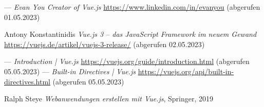 \begin{thebibliography}{99}
	---
	\emph{Evan You Creator of Vue.js}
	\url{https://www.linkedin.com/in/evanyou}
	(abgerufen 01.05.2023)

	Antony Konstantinidis
	\emph{Vue.js 3 – das JavaScript Framework im neuem Gewand}
	\url{https://vuejs.de/artikel/vuejs-3-release/}
	(abgerufen 02.05.2023)

	---
	\emph{Introduction | Vue.js}
	\url{https://vuejs.org/guide/introduction.html}
	(abgerufen 05.05.2023)
	---
	\emph{Built-in Directives | Vue.js}
	\url{https://vuejs.org/api/built-in-directives.html}
	(abgerufen 05.05.2023)

	Ralph Steye
	\emph{Webanwendungen erstellen mit Vue.js},
	Springer,
	2019



\end{thebibliography}

